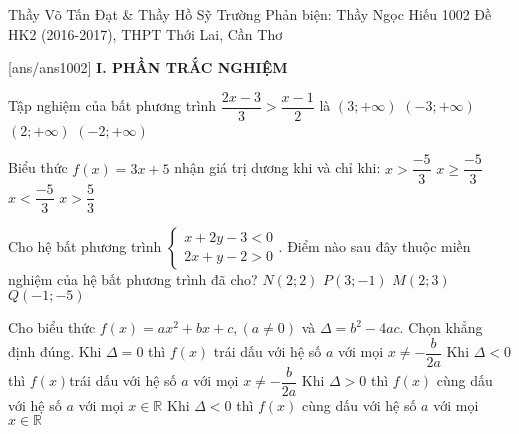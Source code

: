 \begin{name}
{Thầy Võ Tấn Đạt \& Thầy Hồ Sỹ Trường \newline Phản biện: Thầy Ngọc Hiếu}
{1002 Đề HK2 (2016-2017), THPT Thới Lai, Cần Thơ}
	\end{name}
	\setcounter{ex}{0}\setcounter{bt}{0}
	[ans/ans1002]
\noindent\textbf{I. PHẦN TRẮC NGHIỆM}
\begin{ex}%
    Tập nghiệm của bất phương trình $\dfrac{2x-3}{3}>\dfrac{x-1}{2}$ là
    \choice
    {\True $(3;+\infty)$}
    {$(-3;+\infty)$}
    {$(2;+\infty)$}
    {$(-2;+\infty)$}
\end{ex}

\begin{ex}%
    Biểu thức $f(x)=3x+5$ nhận giá trị dương khi và chỉ khi:
    \choice
    {\True $x>\dfrac{-5}{3} $}
    {$x\geq \dfrac{-5}{3} $}
    {$x<\dfrac{-5}{3} $}
    {$ x>\dfrac{5}{3}$}
\end{ex}

\begin{ex}%
    Cho hệ bất phương trình $\begin{cases}
    x+2y-3<0\\
    2x+y-2>0
    \end{cases}$. Điểm nào sau đây thuộc miền nghiệm của hệ bất phương trình đã cho?
    \choice
    {$N(2;2) $}
    {\True$P(3;-1) $}
    {$M(2;3)$}
    {$Q(-1;-5)$}
\end{ex}

\begin{ex}%
    Cho biểu thức $f(x)=ax^2+bx+c,(a\neq 0)$ và $\Delta=b^2-4ac$. Chọn khẳng định đúng.
    \choice
    {Khi $\Delta=0$ thì $f(x)$ trái dấu với hệ số $a$ với mọi $x\neq-\dfrac{b}{2a}$}
    {Khi $\Delta<0$ thì $f(x)$trái dấu với hệ số $a$ với mọi $x\neq-\dfrac{b}{2a}$}
    {Khi $\Delta>0$ thì $f(x)$ cùng dấu với hệ số $a$ với mọi $x\in\mathbb{R}$}
    {\True Khi $\Delta<0$ thì $f(x)$ cùng dấu với hệ số $a$ với mọi $x\in \mathbb{R}$}
    \loigiai{
    }
\end{ex}

